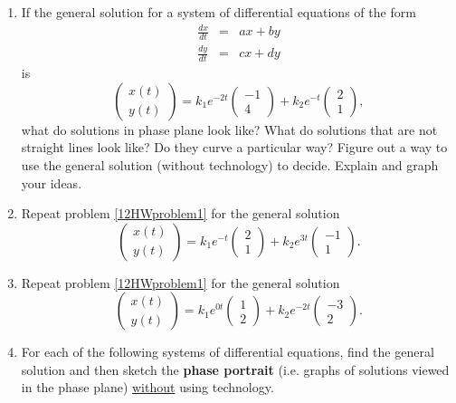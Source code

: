 \begin{enumerate}
\item	If the general solution for a system of differential equations of the form   
\[ \begin{matrix} \frac{dx}{dt}&=&ax+by \\\frac{dy}{dt}&=& cx+dy  \end{matrix}\] 
is  
\[
\begin{pmatrix}x(t)\\y(t)\end{pmatrix}=k_1e^{-2t}\begin{pmatrix}-1\\4\end{pmatrix}+k_2e^{-t} \begin{pmatrix}2\\1\end{pmatrix},
\]
 what do solutions in phase plane look like? What do solutions that are not straight lines look like? Do they curve a particular way? Figure out a way to use the general solution (without technology) to decide. Explain and graph your ideas.\label{12HWproblem1}

\item	Repeat problem \ref{12HWproblem1} for the general solution \label{12HWproblem2}
\[
\begin{pmatrix}x(t)\\y(t)\end{pmatrix}=k_1e^{- t} \begin{pmatrix}2\\1\end{pmatrix}+k_2e^{3t}\begin{pmatrix}-1\\1\end{pmatrix}.
\]

\item	Repeat problem \ref{12HWproblem1} for the general solution \label{12HWproblem3}
\[
\begin{pmatrix}x(t)\\y(t)\end{pmatrix}=k_1e^{0t}\begin{pmatrix}1\\2\end{pmatrix}+k_2e^{-2t}\begin{pmatrix}-3\\2\end{pmatrix}.
\]

\item	For each of the following systems of differential equations, find the general solution and then sketch the \textbf{phase portrait} (i.e. graphs of solutions viewed in the phase plane) \underline{without} using technology. \label{12HWproblem4}


\end{enumerate}
